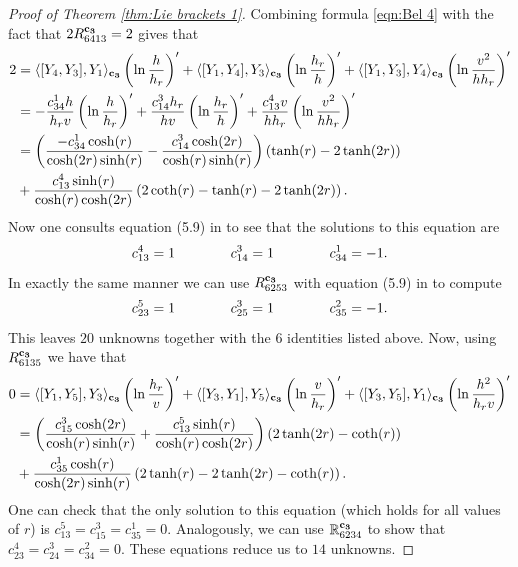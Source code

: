 \documentclass[10pt]{amsart}
\def\R{\mathbb{R}}
\def\la{\langle}
\def\ra{\rangle}
\theoremstyle{definition}
\theoremstyle{remark}
\numberwithin{equation}{section}
\begin{document}
\begin{proof}[Proof of Theorem \ref{thm:Lie brackets 1}]
Combining formula \eqref{eqn:Bel 4} with the fact that $2R^{\bf c_3}_{6413} = 2$ gives that
	\begin{align*}
	2 &= \la [Y_4,Y_3],Y_1 \ra_{\bf c_3} \left( \ln \frac{h}{h_r} \right)' + \la [Y_1,Y_4],Y_3 \ra_{\bf c_3} \left( \ln \frac{h_r}{h} \right)' + \la [Y_1,Y_3],Y_4 \ra_{\bf c_3} \left( \ln \frac{v^2}{hh_r} \right)'  \\
	&= - \frac{c_{34}^1 h}{h_r v} \left( \ln \frac{h}{h_r} \right)' + \frac{c_{14}^3 h_r}{hv} \left( \ln \frac{h_r}{h} \right)' + \frac{c_{13}^4 v}{hh_r} \left( \ln \frac{v^2}{hh_r} \right)'  \\
	&= \left( \frac{-c_{34}^1 \cosh(r)}{\cosh(2r) \sinh(r)} - \frac{c_{14}^3 \cosh(2r)}{\cosh(r) \sinh(r)} \right) \left( \tanh(r) - 2 \tanh(2r) \right)  \\
	&+ \frac{c_{13}^4 \sinh(r)}{\cosh(r) \cosh(2r)} \left( 2 \coth(r) - \tanh(r) - 2 \tanh(2r) \right).
	\end{align*}
Now one consults equation (5.9) in \cite{Min} to see that the solutions to this equation are
	\begin{equation*}
	c_{13}^4 = 1	\hskip 40pt	c_{14}^3 = 1	\hskip 40pt	c_{34}^1 = -1.
	\end{equation*}
In exactly the same manner we can use $R^{\bf c_3}_{6253}$ with equation (5.9) in \cite{Min} to compute
	\begin{equation*}
	c_{23}^5 = 1	\hskip 40pt	c_{25}^3 = 1	\hskip 40pt	c_{35}^2 = -1.
	\end{equation*}
This leaves $20$ unknowns together with the $6$ identities listed above.  
Now, using $R^{\bf c_3}_{6135}$ we have that
	\begin{align*}
	0 &= \la [Y_1,Y_5],Y_3 \ra_{\bf c_3} \left( \ln \frac{h_r}{v} \right)' + \la [Y_3,Y_1],Y_5 \ra_{\bf c_3} \left( \ln \frac{v}{h_r} \right)' + \la [Y_3,Y_5],Y_1 \ra_{\bf c_3} \left( \ln \frac{h^2}{h_r v} \right)'  \\
	&= \left( \frac{c_{15}^3 \cosh(2r)}{\cosh(r) \sinh(r)} + \frac{c_{13}^5 \sinh(r)}{\cosh(r) \cosh(2r)} \right) \left( 2 \tanh(2r) - \coth(r) \right)  \\
	&+ \frac{c_{35}^1 \cosh(r)}{\cosh(2r) \sinh(r)} \left( 2 \tanh(r) - 2\tanh(2r) - \coth(r) \right).
	\end{align*}
One can check that the only solution to this equation (which holds for all values of $r$) is $c_{13}^5 = c_{15}^3 = c_{35}^1 = 0$.  
Analogously, we can use $\R^{\bf c_3}_{6234}$ to show that $c_{23}^4 = c_{24}^3 = c_{34}^2 = 0$.  
These equations reduce us to $14$ unknowns.  


\end{proof}
\end{document}

